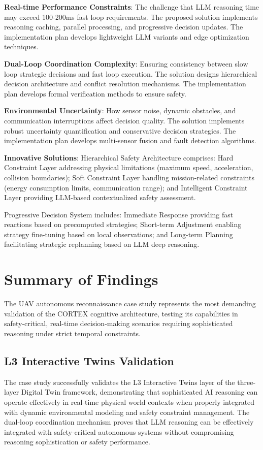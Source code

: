 \textbf{Real-time Performance Constraints}: The challenge that LLM reasoning time may exceed 100-200ms fast loop requirements. The proposed solution implements reasoning caching, parallel processing, and progressive decision updates. The implementation plan develops lightweight LLM variants and edge optimization techniques.

\textbf{Dual-Loop Coordination Complexity}: Ensuring consistency between slow loop strategic decisions and fast loop execution. The solution designs hierarchical decision architecture and conflict resolution mechanisms. The implementation plan develops formal verification methods to ensure safety.

\textbf{Environmental Uncertainty}: How sensor noise, dynamic obstacles, and communication interruptions affect decision quality. The solution implements robust uncertainty quantification and conservative decision strategies. The implementation plan develops multi-sensor fusion and fault detection algorithms.

\textbf{Innovative Solutions}: Hierarchical Safety Architecture comprises: Hard Constraint Layer addressing physical limitations (maximum speed, acceleration, collision boundaries); Soft Constraint Layer handling mission-related constraints (energy consumption limits, communication range); and Intelligent Constraint Layer providing LLM-based contextualized safety assessment.

Progressive Decision System includes: Immediate Response providing fast reactions based on precomputed strategies; Short-term Adjustment enabling strategy fine-tuning based on local observations; and Long-term Planning facilitating strategic replanning based on LLM deep reasoning.

\section{Summary of Findings}

The UAV autonomous reconnaissance case study represents the most demanding validation of the CORTEX cognitive architecture, testing its capabilities in safety-critical, real-time decision-making scenarios requiring sophisticated reasoning under strict temporal constraints.

\subsection{L3 Interactive Twins Validation}

The case study successfully validates the L3 Interactive Twins layer of the three-layer Digital Twin framework, demonstrating that sophisticated AI reasoning can operate effectively in real-time physical world contexts when properly integrated with dynamic environmental modeling and safety constraint management. The dual-loop coordination mechanism proves that LLM reasoning can be effectively integrated with safety-critical autonomous systems without compromising reasoning sophistication or safety performance.

